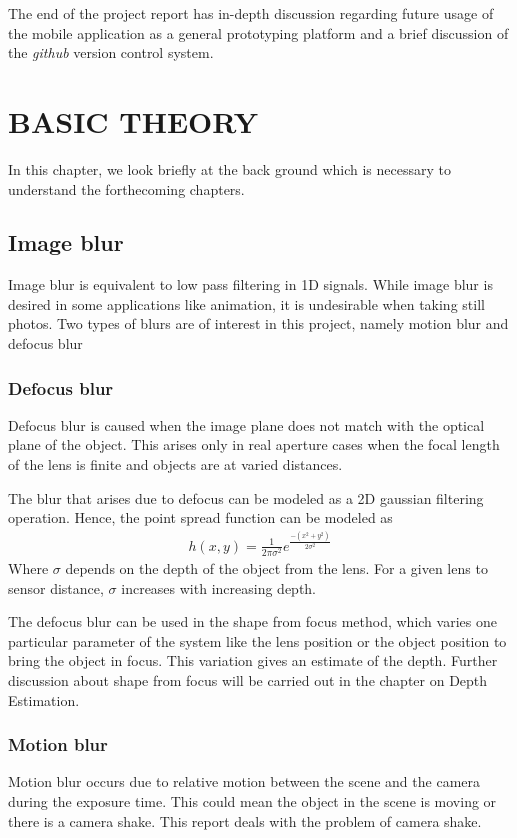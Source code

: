\documentclass[BTech]{iitmdiss}
\begin{document}
The end of the project report has in-depth discussion regarding future
usage of the mobile application as a general prototyping platform and a
brief discussion of the \emph{github} version control system.

\chapter{BASIC THEORY}
\label{chap:basic_theory}
In this chapter, we look briefly at the back ground which is necessary 
to understand the forthecoming chapters. 

\section{Image blur}
\label{basic_theory:image_blur}
Image blur is equivalent to low pass filtering in 1D signals. While 
image blur is desired in some applications like animation, it is 
undesirable when taking still photos. Two types of blurs are of interest
in this project, namely motion blur and defocus blur

\subsection{Defocus blur}
\label{basic_theory:image_blur:optical}
Defocus blur is caused when the image plane does not match with the 
optical plane of the object. This arises only in real aperture cases
when the focal length of the lens is finite and objects are at varied
distances. 

The blur that arises due to defocus can be modeled as a 2D gaussian
filtering operation. Hence, the point spread function can be modeled as
\begin{align*}
h(x,y) = \frac{1}{2\pi\sigma^2}e^\frac{-(x^2+y^2)}{2\sigma^2}
\end{align*}
Where $\sigma$ depends on the depth of the object from the lens. For a 
given lens to sensor distance, $\sigma$ increases with increasing depth.

The defocus blur can be used in the shape from focus method, which 
varies one particular parameter of the system like the lens position or
the object position to bring the object in focus. This variation gives 
an estimate of the depth. Further discussion about shape from focus will
be carried out in the chapter on Depth Estimation.

\subsection{Motion blur}
\label{basic_theory:image_blur:motion}
Motion blur occurs due to relative motion between the scene and the 
camera during the exposure time. This could mean the object in the scene
is moving or there is a camera shake. This report deals with the problem
of camera shake.
\end{document}
